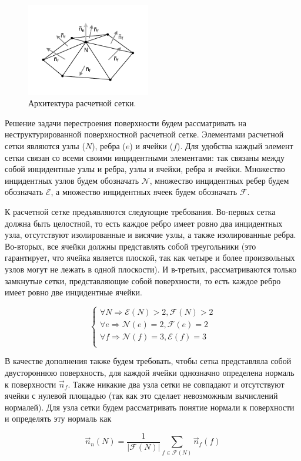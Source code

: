 \begin{figure}[h]
\includegraphics[width=0.48\textwidth]{pics/pic_architecture_size.pdf}
\caption{Архитектура расчетной сетки.}\label{fig:pic_architecture}
\end{figure}

Решение задачи перестроения поверхности будем рассматривать на неструктурированной поверхностной расчетной сетке.
Элементами расчетной сетки являются узлы ($N$), ребра ($e$)  и ячейки ($f$).
Для удобства каждый элемент сетки связан со всеми своими инцидентными элементами: так связаны между собой инцидентные узлы и ребра, узлы и ячейки, ребра и ячейки. Множество инцидентных узлов будем обозначать $\mathscr{N}$, множество инцидентных ребер будем обозначать $\mathscr{E}$, а множество инцидентных ячеек будем обозначать $\mathscr{F}$.

К расчетной сетке предъявляются следующие требования.
Во-первых сетка должна быть целостной, то есть каждое ребро имеет ровно два инцидентных узла, отсутствуют изолированные и висячие узлы, а также изолированные ребра.
Во-вторых, все ячейки должны представлять собой треугольники (это гарантирует, что ячейка является плоской, так как четыре и более произвольных узлов могут не лежать в одной плоскости).
И в-третьих, рассматриваются только замкнутые сетки, представляющие собой поверхности, то есть каждое ребро имеет ровно две инцидентные ячейки.

\begin{equation}
\begin{cases}
\forall N \Rightarrow \mathscr{E}(N) > 2, \mathscr{F}(N) > 2 \\
\forall e \Rightarrow \mathscr{N}(e) = 2 , \mathscr{F}(e) = 2 \\
\forall f \Rightarrow \mathscr{N}(f) = 3 , \mathscr{E}(f) = 3 \\
\end{cases}
\end{equation}

В качестве дополнения также будем требовать, чтобы сетка представляла собой двустороннюю поверхность, для каждой ячейки однозначно определена нормаль к поверхности $\vec{n}_f$.
Также никакие два узла сетки не совпадают и отсутствуют ячейки с нулевой площадью (так как это сделает невозможным вычислений нормалей).
Для узла сетки будем рассматривать понятие нормали к поверхности и определять эту нормаль как

\begin{equation}
\vec{n}_n(N) = \frac{1}{|\mathscr{F}(N)|} \sum_{f \in \mathscr{F}(N)}{\vec{n}_f(f)}
\end{equation}